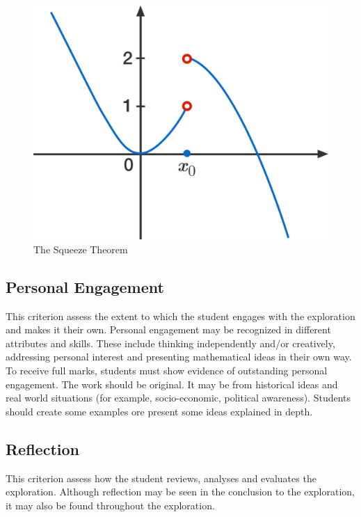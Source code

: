 \documentclass[11pt]{article}
\begin{document}
\begin{figure}[H]
	\centering
	\includegraphics[scale=0.2]{limit}
	\caption{The Squeeze Theorem}
	\label{fig:squeeze}
\end{figure}

\subsection{Personal Engagement}
This criterion assess the extent to which the student engages with the exploration and makes it their own. Personal engagement may be recognized in different attributes and skills. These include thinking independently and/or creatively, addressing personal interest and presenting mathematical ideas in their own way.\\

To receive full marks, students must show evidence of outstanding personal engagement. The work should be original. It may be from historical ideas and real world situations (for example, socio-economic, political awareness). Students should create some examples ore present some ideas explained in depth.

\subsection{Reflection}
This criterion assess how the student reviews, analyses and evaluates the exploration. Although reflection may be seen in the conclusion to the exploration, it may also be found throughout the exploration.\\
\end{document}
